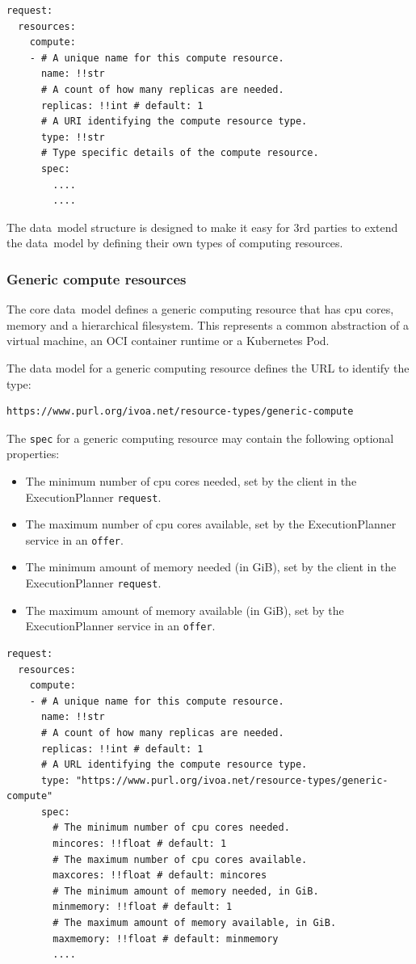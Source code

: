 \documentclass[11pt,a4paper]{ivoa}
\newcommand{\datamodel} {data~model}
\newcommand{\execplanner} {ExecutionPlanner}
\newcommand{\kubernetes} {Kubernetes}
\newcommand{\codeword}[1] {\texttt{#1}}
\begin{document}
\begin{lstlisting}[]
request:
  resources:
    compute:
    - # A unique name for this compute resource.
      name: !!str
      # A count of how many replicas are needed.
      replicas: !!int # default: 1
      # A URI identifying the compute resource type.
      type: !!str
      # Type specific details of the compute resource.
      spec:
        ....
        ....
\end{lstlisting}

The \datamodel{} structure is designed to make it easy for 3rd parties
to extend the \datamodel{} by defining their own types of computing
resources.

\subsubsection{Generic compute resources}
\label{datamodel-generic-compute}

The core \datamodel{} defines a generic computing resource
that has cpu cores, memory and a hierarchical filesystem.
This represents a common abstraction of a virtual machine,
an OCI container runtime or a \kubernetes{} Pod.

The data model for a generic computing resource defines the URL to identify
the type:
\begin{lstlisting}[]
https://www.purl.org/ivoa.net/resource-types/generic-compute
\end{lstlisting}
\hfill \break
The \codeword{spec} for a generic computing resource may contain the following optional properties:
\begin{itemize}
    \item The minimum number of cpu cores needed, set by the client in the \execplanner{} \codeword{request}.
    \item The maximum number of cpu cores available, set by the \execplanner{} service in an \codeword{offer}.
    \item The minimum amount of memory needed (in GiB), set by the client in the \execplanner{} \codeword{request}.
    \item The maximum amount of memory available (in GiB), set by the \execplanner{} service in an \codeword{offer}.
\end{itemize}

\begin{lstlisting}[]
request:
  resources:
    compute:
    - # A unique name for this compute resource.
      name: !!str
      # A count of how many replicas are needed.
      replicas: !!int # default: 1
      # A URL identifying the compute resource type.
      type: "https://www.purl.org/ivoa.net/resource-types/generic-compute"
      spec:
        # The minimum number of cpu cores needed.
        mincores: !!float # default: 1
        # The maximum number of cpu cores available.
        maxcores: !!float # default: mincores
        # The minimum amount of memory needed, in GiB.
        minmemory: !!float # default: 1
        # The maximum amount of memory available, in GiB.
        maxmemory: !!float # default: minmemory
        ....
\end{lstlisting}
\end{document}
